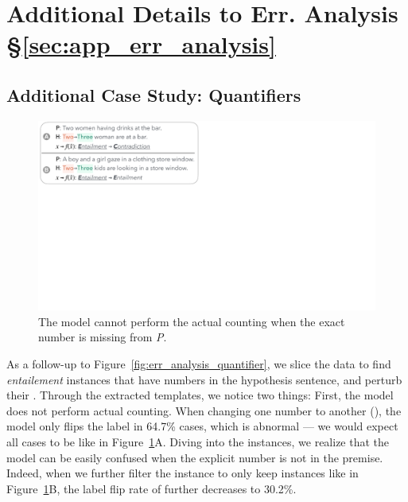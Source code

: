 \section{Additional Details to Err. Analysis \S\ref{sec:app_err_analysis}}
\label{appendix:err_analysis}

\subsection{Additional Case Study: Quantifiers}
\label{appendix:err_analysis_quantifier_case}

\begin{figure}[t]
\centering
\includegraphics[trim={0 25.2cm 34.5cm 0cm},clip,width=1\columnwidth]{figures/err_analysis_two_three}
\vspace{-20pt}
\caption{
The \nli model cannot perform the actual counting when the exact number is missing from \emph{P}.
}
\vspace{-10pt}
\label{fig:err_analysis_two_three}
\end{figure}



As a follow-up to Figure~\ref{fig:err_analysis_quantifier}, we slice the data to find \emph{entailement} instances that have numbers in the hypothesis sentence, and perturb their .
Through the extracted templates, we notice two things: 
First, the model does not perform actual counting. 
When changing one number to another (), the model only flips the label in 64.7\% cases, which is abnormal --- we would expect all cases to be like in Figure~\ref{fig:err_analysis_two_three}A.
Diving into the instances, we realize that the model can be easily confused when the explicit number is not in the premise. Indeed, when we further filter the instance to only keep instances like in Figure~\ref{fig:err_analysis_two_three}B, the label flip rate of  further decreases to 30.2\%.


